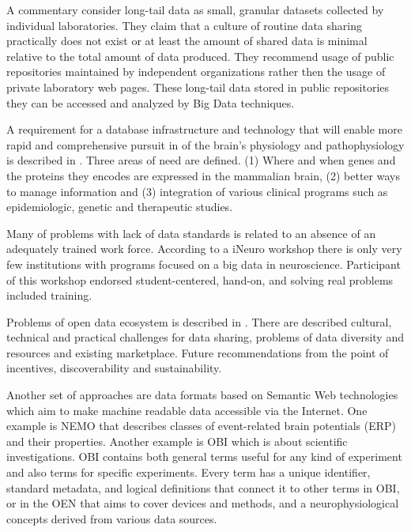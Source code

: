 \documentclass[utf8]{frontiersSCNS} %
\begin{document}
A commentary \citep{Ferguson2014} consider long-tail data as small, granular datasets collected by individual laboratories. They claim that a culture of routine data sharing practically does not exist or at least the amount of shared data is minimal relative to the total amount of data produced. They recommend usage of public repositories maintained by independent organizations rather then the usage of private laboratory web pages. These long-tail data stored in public repositories they can be accessed and analyzed by Big Data techniques.


A requirement for a database infrastructure and technology that will enable more rapid and comprehensive pursuit in of the brain's physiology and pathophysiology is described in \citep{Insel2004}. Three areas of need are defined. (1) Where and when genes and the proteins they encodes are expressed in the mammalian brain, (2) better ways to manage information and (3) integration of various clinical programs such as epidemiologic, genetic and therapeutic studies.

Many of problems with lack of data standards is related to an absence of an adequately trained work force.  According to a iNeuro workshop \citep{10.3389/fninf.2016.00028} there is only very few institutions with programs focused on a big data in neuroscience. Participant of this workshop endorsed student-centered, hand-on, and solving real problems included training.

Problems of open data ecosystem is described in \citep{WIENER2016617}. There are described cultural, technical and practical challenges for data sharing, problems of data diversity and resources and existing marketplace. Future recommendations from the point of incentives, discoverability and sustainability.
 
Another  set of approaches are data formats based on Semantic Web technologies which aim to make machine readable data accessible via the Internet.  One example is NEMO \citep{DouFRFMT07} that describes classes of event-related brain potentials (ERP) and their properties.  Another example is OBI \citep{citeulike:7291351}  which is about scientific investigations.  OBI contains both general terms useful for any kind of experiment and also terms for specific experiments. Every term has a unique identifier, standard metadata, and logical definitions that connect it to other terms in OBI, or in the OEN \citep{10.3389/conf.fninf.2014.18.00044}  that aims to cover devices and methods, and a neurophysiological concepts derived from various data sources. 
\end{document}
